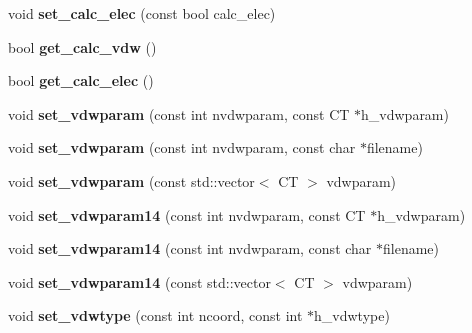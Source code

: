 \begin{DoxyCompactItemize}
\item 
\hypertarget{classCudaPMEDirectForce_a5c4ad3a79e57c9212ddb43599fd604c5}{}\label{classCudaPMEDirectForce_a5c4ad3a79e57c9212ddb43599fd604c5} 
void {\bfseries set\+\_\+calc\+\_\+elec} (const bool calc\+\_\+elec)
\item 
\hypertarget{classCudaPMEDirectForce_a4ade5d2448929b9e16be7f70a95b069f}{}\label{classCudaPMEDirectForce_a4ade5d2448929b9e16be7f70a95b069f} 
bool {\bfseries get\+\_\+calc\+\_\+vdw} ()
\item 
\hypertarget{classCudaPMEDirectForce_a1672e6dbef6826e6a4a256a7eb355173}{}\label{classCudaPMEDirectForce_a1672e6dbef6826e6a4a256a7eb355173} 
bool {\bfseries get\+\_\+calc\+\_\+elec} ()
\item 
\hypertarget{classCudaPMEDirectForce_af371a75ded80c2dfed8af667f6ef91b5}{}\label{classCudaPMEDirectForce_af371a75ded80c2dfed8af667f6ef91b5} 
void {\bfseries set\+\_\+vdwparam} (const int nvdwparam, const CT $\ast$h\+\_\+vdwparam)
\item 
\hypertarget{classCudaPMEDirectForce_ac1cc762a417457f714b22086a745d4eb}{}\label{classCudaPMEDirectForce_ac1cc762a417457f714b22086a745d4eb} 
void {\bfseries set\+\_\+vdwparam} (const int nvdwparam, const char $\ast$filename)
\item 
\hypertarget{classCudaPMEDirectForce_a395020f6c963099db0253b0f7d99310a}{}\label{classCudaPMEDirectForce_a395020f6c963099db0253b0f7d99310a} 
void {\bfseries set\+\_\+vdwparam} (const std\+::vector$<$ CT $>$ vdwparam)
\item 
\hypertarget{classCudaPMEDirectForce_a8bd5f24897fdf3498d166b6c62354793}{}\label{classCudaPMEDirectForce_a8bd5f24897fdf3498d166b6c62354793} 
void {\bfseries set\+\_\+vdwparam14} (const int nvdwparam, const CT $\ast$h\+\_\+vdwparam)
\item 
\hypertarget{classCudaPMEDirectForce_af8544e4e8351069a16d2fd69c7ef2dac}{}\label{classCudaPMEDirectForce_af8544e4e8351069a16d2fd69c7ef2dac} 
void {\bfseries set\+\_\+vdwparam14} (const int nvdwparam, const char $\ast$filename)
\item 
\hypertarget{classCudaPMEDirectForce_a88fafb4e20fc47ed493b1dcb6f5fdf29}{}\label{classCudaPMEDirectForce_a88fafb4e20fc47ed493b1dcb6f5fdf29} 
void {\bfseries set\+\_\+vdwparam14} (const std\+::vector$<$ CT $>$ vdwparam)
\item 
\hypertarget{classCudaPMEDirectForce_a3afbd56eb0a15d10691636dc317e2014}{}\label{classCudaPMEDirectForce_a3afbd56eb0a15d10691636dc317e2014} 
void {\bfseries set\+\_\+vdwtype} (const int ncoord, const int $\ast$h\+\_\+vdwtype)

\end{DoxyCompactItemize}

